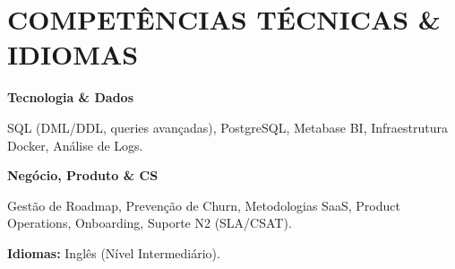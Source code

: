 \documentclass[10pt,a4paper]{article}
\begin{document}
\section*{COMPETÊNCIAS TÉCNICAS \& IDIOMAS}
\textbf{Tecnologia \& Dados}\par
SQL (DML/DDL, queries avançadas), PostgreSQL, Metabase BI, Infraestrutura Docker, Análise de Logs.
\par\textbf{Negócio, Produto \& CS}\par
Gestão de Roadmap, Prevenção de Churn, Metodologias SaaS, Product Operations, Onboarding, Suporte N2 (SLA/CSAT).
\par\textbf{Idiomas:} Inglês (Nível Intermediário).
\end{document}
